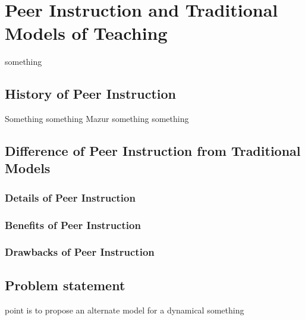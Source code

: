 \chapter{Peer Instruction and Traditional Models of Teaching}

\hspace{\parindent} something
\section{History of Peer Instruction}
\hspace{\parindent} Something something Mazur something something
\newpage
\section{Difference of Peer Instruction from Traditional Models}
\subsection{Details of Peer Instruction}
\subsection{Benefits of Peer Instruction}
\subsection{Drawbacks of Peer Instruction}
\section{Problem statement}
point is to propose an alternate model for a dynamical something
